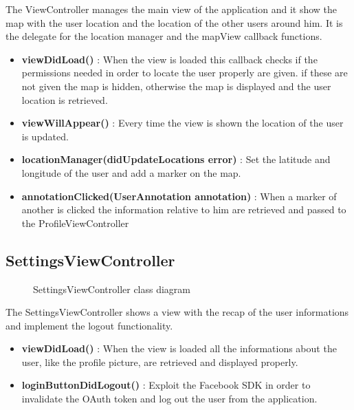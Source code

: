 The ViewController manages the main view of the application and it show the map with the user location and the location of the other users around him. It is the delegate for the location manager and the mapView callback functions.

\begin{itemize}
\item \textbf{viewDidLoad()} : When the view is loaded this callback checks if the permissions needed in order to locate the user properly are given. if these are not given the map is hidden, otherwise the map is displayed and the user location is retrieved.
\item \textbf{viewWillAppear()} : Every time the view is shown the location of the user is updated.
\item \textbf{locationManager(didUpdateLocations error)} : Set the latitude and longitude of the user and add a marker on the map.
\item \textbf{annotationClicked(UserAnnotation annotation)} : When a marker of another is clicked the information relative to him are retrieved and passed to the ProfileViewController
\end{itemize}

\subsection{SettingsViewController} 
\begin{figure}[H]
\caption{SettingsViewController class diagram}

\end{figure}

The SettingsViewController shows a view with the recap of the user informations and implement the logout functionality.

\begin{itemize}
\item \textbf{viewDidLoad()} : When the view is loaded all the informations about the user, like the profile picture, are retrieved and displayed properly.
\item \textbf{loginButtonDidLogout()} : Exploit the Facebook SDK in order to invalidate the OAuth token and log out the user from the application.
\end{itemize}

